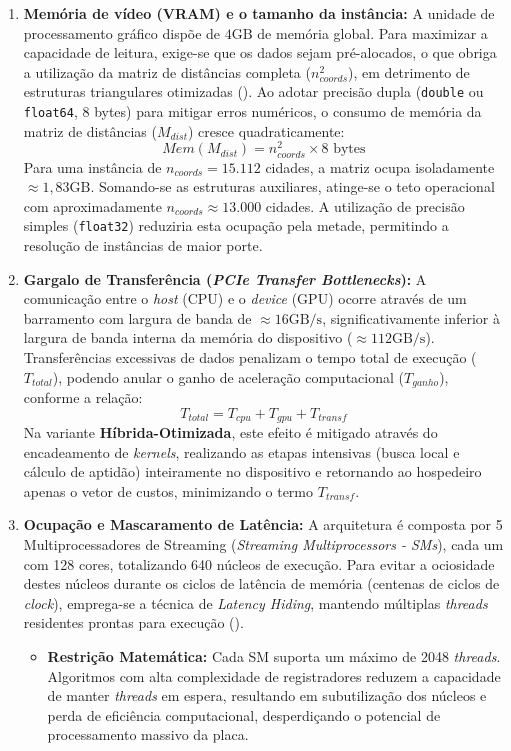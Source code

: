 \begin{enumerate}
\def\labelenumi{\arabic{enumi}.}
\item
  \textbf{Memória de vídeo (VRAM) e o tamanho da instância:} A unidade
  de processamento gráfico dispõe de \(4\text{GB}\) de memória global.
  Para maximizar a capacidade de leitura, exige-se que os dados sejam
  pré-alocados, o que obriga a utilização da matriz de distâncias
  completa (\(n_{coords}^2\)), em detrimento de estruturas triangulares
  otimizadas (). Ao adotar
  precisão dupla (\texttt{double} ou \texttt{float64}, 8 bytes) para
  mitigar erros numéricos, o consumo de memória da matriz de distâncias
  (\(M_{dist}\)) cresce quadraticamente:
  \[Mem(M_{dist}) = n_{coords}^2 \times 8 \text{ bytes}\] Para uma
  instância de \(n_{coords}=15.112\) cidades, a matriz ocupa
  isoladamente \(\approx 1,83 \text{GB}\). Somando-se as estruturas
  auxiliares, atinge-se o teto operacional com aproximadamente
  \(n_{coords} \approx 13.000\) cidades. A utilização de precisão
  simples (\texttt{float32}) reduziria esta ocupação pela metade,
  permitindo a resolução de instâncias de maior porte.
\item
  \textbf{Gargalo de Transferência (\emph{PCIe Transfer Bottlenecks}):}
  A comunicação entre o \emph{host} (CPU) e o \emph{device} (GPU) ocorre
  através de um barramento com largura de banda de
  \(\approx 16 \text{GB/s}\), significativamente inferior à largura de
  banda interna da memória do dispositivo (\(\approx 112 \text{GB/s}\)).
  Transferências excessivas de dados penalizam o tempo total de execução
  (\(T_{total}\)), podendo anular o ganho de aceleração computacional
  (\(T_{ganho}\)), conforme a relação:
  \[T_{total} = T_{cpu} + T_{gpu} + T_{transf}\] Na variante
  \textbf{Híbrida-Otimizada}, este efeito é mitigado através do
  encadeamento de \emph{kernels}, realizando as etapas intensivas (busca
  local e cálculo de aptidão) inteiramente no dispositivo e retornando
  ao hospedeiro apenas o vetor de custos, minimizando o termo
  \(T_{transf}\).
\item
  \textbf{Ocupação e Mascaramento de Latência:} A arquitetura é composta
  por 5 Multiprocessadores de Streaming (\emph{Streaming Multiprocessors
  - SMs}), cada um com 128 cores, totalizando 640 núcleos de execução.
  Para evitar a ociosidade destes núcleos durante os ciclos de latência
  de memória (centenas de ciclos de \emph{clock}), emprega-se a técnica
  de \emph{Latency Hiding}, mantendo múltiplas \emph{threads} residentes
  prontas para execução ().

  \begin{itemize}
  \tightlist
  \item
    \textbf{Restrição Matemática:} Cada SM suporta um máximo de 2048
    \emph{threads}. Algoritmos com alta complexidade de registradores
    reduzem a capacidade de manter \emph{threads} em espera, resultando
    em subutilização dos núcleos e perda de eficiência computacional,
    desperdiçando o potencial de processamento massivo da placa.
  \end{itemize}
\end{enumerate}

